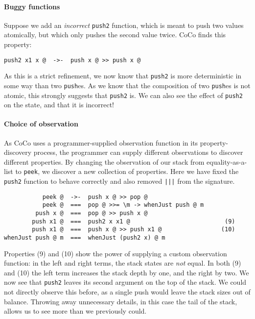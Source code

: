 \paragraph{Buggy functions}
Suppose we add an \emph{incorrect} \verb|push2| function, which is
meant to push two values atomically, but which only pushes the second
value twice.  CoCo finds this property:

\begin{verbatim}
push2 x1 x @  ->-  push x @ >> push x @
\end{verbatim}

\noindent
As this is a strict refinement, we now know that \verb|push2| is more
deterministic in some way than two \verb|push|es.  As we know that the
composition of two \verb|push|es is not atomic, this strongly suggests
that \verb|push2| is.  We can also see the effect of \verb|push2| on
the state, and that it is incorrect!

\paragraph{Choice of observation}
As CoCo uses a programmer-supplied observation function in its
property-discovery process, the programmer can supply different
observations to discover different properties.  By changing the
observation of our stack from equality-as-a-list to \verb|peek|, we
discover a new collection of properties.  Here we have fixed the
\verb|push2| function to behave correctly and also removed \verb#|||#
from the signature.

\begin{verbatim}
           peek @  ->-  push x @ >> pop @
           peek @  ===  pop @ >>= \m -> whenJust push @ m
         push x @  ===  pop @ >> push x @
        push x1 @  ===  push2 x x1 @                           (9)
        push x1 @  ===  push x @ >> push x1 @                 (10)
whenJust push @ m  ===  whenJust (push2 x) @ m
\end{verbatim}

\noindent
Properties (9) and (10) show the power of supplying a custom
observation function: in the left and right terms, the stack states
are \emph{not} equal.  In both (9) and (10) the left term increases
the stack depth by one, and the right by two.  We now see that
\verb|push2| leaves its second argument on the top of the stack.  We
could not directly observe this before, as a single push would leave
the stack sizes out of balance.  Throwing away unnecessary details, in
this case the tail of the stack, allows us to see more than we
previously could.

